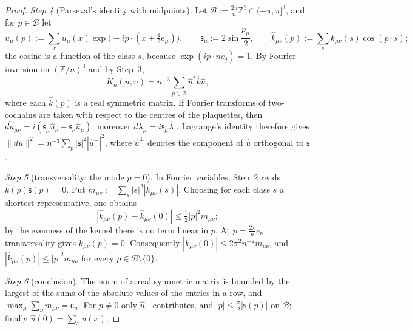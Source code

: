 \documentclass[11pt,letterpaper,reqno]{amsart}
\theoremstyle{definition}
\begin{document}
\begin{proof}
\emph{Step 4} (Parseval's identity with midpoints).
Let $\mathcal B:=\frac{2\pi}{n}\mathbb Z^3\cap(-\pi,\pi]^3$, and for $p\in\mathcal B$ let
\begin{equation*}
\hat u_\mu(p):=\sum_xu_\mu(x)\exp\bigl(-ip\cdot(x+\tfrac12e_\mu)\bigr),\qquad\mathsf s_\mu:=2\sin\frac{p_\mu}{2},\qquad\hat k_{\mu\nu}(p):=\sum_sk_{\mu\nu}(s)\cos(p\cdot s);
\end{equation*}
the cosine is a function of the class $s$, because $\exp(ip\cdot ne_j)=1$.
By Fourier inversion on $(\mathbb Z/n)^3$ and by Step~3,
\begin{equation*}
K_n(u,u)=n^{-3}\sum_{p\in\mathcal B}\hat u^*\hat k\hat u,
\end{equation*}
where each $\hat k(p)$ is a real symmetric matrix.
If Fourier transforms of two-cochains are taken with respect to the centres of the plaquettes, then $\widehat{du}_{\mu\nu}=\allowbreak i(\mathsf s_\mu\hat u_\nu-\mathsf s_\nu\hat u_\mu)$; moreover $\widehat{d\lambda}_\mu=i\mathsf s_\mu\hat\lambda$ \cite[Definition~2.1]{QEDII}.
Lagrange's identity therefore gives $\|du\|^2=n^{-3}\sum_p|\mathsf s|^2|\hat u^\perp|^2$, where $\hat u^\perp$ denotes the component of $\hat u$ orthogonal to $\mathsf s$.

\emph{Step 5} (transversality; the mode $p=0$).
In Fourier variables, Step~2 reads $\hat k(p)\mathsf s(p)=0$.
Put $m_{\mu\nu}:=\sum_s|s|^2|k_{\mu\nu}(s)|$.
Choosing for each class $s$ a shortest representative, one obtains
\begin{equation*}
|\hat k_{\mu\nu}(p)-\hat k_{\mu\nu}(0)|\le\tfrac12|p|^2m_{\mu\nu};
\end{equation*}
by the evenness of the kernel there is no term linear in $p$.
At $p=\frac{2\pi}{n}e_\nu$ transversality gives $\hat k_{\mu\nu}(p)=0$.
Consequently $|\hat k_{\mu\nu}(0)|\le2\pi^2n^{-2}m_{\mu\nu}$, and $|\hat k_{\mu\nu}(p)|\le|p|^2m_{\mu\nu}$ for every $p\in\mathcal B\setminus\{0\}$.

\emph{Step 6} (conclusion).
The norm of a real symmetric matrix is bounded by the largest of the sums of the absolute values of the entries in a row, and $\max_\mu\sum_\nu m_{\mu\nu}=\mathsf c_n$.
For $p\ne0$ only $\hat u^\perp$ contributes, and $|p|\le\frac\pi2|\mathsf s(p)|$ on $\mathcal B$; finally $\hat u(0)=\sum_xu(x)$.
\end{proof}
\end{document}

